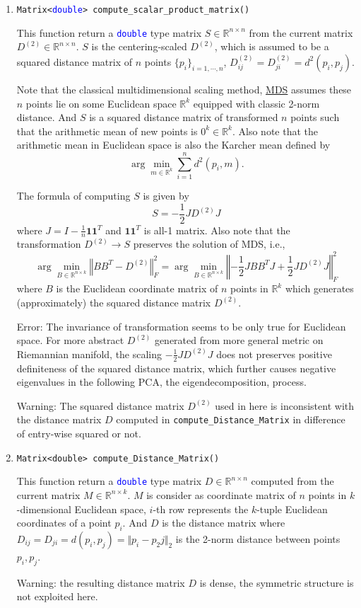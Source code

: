 \documentclass[11pt,a4paper]{article}
\newcommand{\mmemref}[2]{\texttt{#1}\label{#2#1}}
\newcommand{\ttype}[1]{\textcolor{blue}{\texttt{#1}}}
\theoremstyle{definition}
\theoremstyle{definition}
\numberwithin{equation}{section}
\begin{document}
	\begin{enumerate}
		\item \texttt{Matrix<\ttype{double}> compute\_scalar\_product\_matrix()}
		
		This function return a \ttype{double} type matrix $S\in \mathbb{R}^{n\times n}$ from the current matrix $D^{(2)}\in \mathbb{R}^{n\times n}$. $S$ is the centering-scaled $D^{(2)}$, which is assumed to be a squared distance matrix of $n$ points $\{p_i\}_{i=1,\cdots, n}$, $D^{(2)}_{ij}=D^{(2)}_{ji}=d^2(p_i,p_j)$. 
		
		Note that the classical multidimensional scaling method, \href{https://en.wikipedia.org/wiki/Multidimensional_scaling}{MDS} assumes these $n$ points lie on some Euclidean space $\mathbb{R}^k$ equipped with classic 2-norm distance. And $S$ is a squared distance matrix of transformed $n$ points such that the arithmetic mean of new points is $0^k\in \mathbb{R}^k$. Also note that the arithmetic mean in Euclidean space is also the Karcher mean defined by
		\[
			\arg\min\limits_{m\in \mathbb{R}^k}\sum_{i=1}^n d^2(p_i,m).
		\]
		
		The formula of computing $S$ is given by
		\[
			S=-\frac{1}{2}JD^{(2)}J
		\]
		where $J=I-\frac{1}{n}\mathbf{1}\mathbf{1}^T$ and $\mathbf{1}\mathbf{1}^T$ is all-1 matrix. Also note that the transformation $D^{(2)}\to S$ preserves the solution of MDS, i.e.,
		\[
			\arg\min\limits_{B\in \mathbb{R}^{n\times k}} \left\Vert BB^T - D^{(2)}\right\Vert^2_F = \arg\min\limits_{B\in \mathbb{R}^{n\times k}} \left\Vert -\frac{1}{2}JBB^TJ + \frac{1}{2}JD^{(2)}J\right\Vert^2_F
		\]
		where $B$ is the Euclidean coordinate matrix of $n$ points in $\mathbb{R}^k$ which generates (approximately) the squared distance matrix $D^{(2)}$.
		
		Error: The invariance of transformation seems to be only true for Euclidean space. For more abstract $D^{(2)}$ generated from more general metric on Riemannian manifold, the scaling $-\frac{1}{2}JD^{(2)}J$ does not preserves positive definiteness of the squared distance matrix, which further causes negative eigenvalues in the following PCA, the eigendecomposition, process.
		
		Warning: The squared distance matrix $D^{(2)}$ used in here is inconsistent with the distance matrix $D$ computed in 
		\texttt{compute\_Distance\_Matrix} in difference of entry-wise squared or not. 
		
		\item \texttt{Matrix<double> compute\_Distance\_Matrix()}
		
		This function return a \ttype{double} type matrix $D\in \mathbb{R}^{n\times n}$ computed from the current matrix $M\in \mathbb{R}^{n\times k}$. $M$ is consider as coordinate matrix of $n$ points in $k$-dimensional Euclidean space, $i$-th row represents the $k$-tuple Euclidean coordinates of a point $p_i$. And $D$ is the distance matrix where $D_{ij}=D_{ji}=d(p_i,p_j)=\Vert p_i - p_2j\Vert_2$ is the 2-norm distance between points $p_i,p_j$.
		
		Warning: the resulting distance matrix $D$ is dense, the symmetric structure is not exploited here. 
	\end{enumerate}
\end{document}
